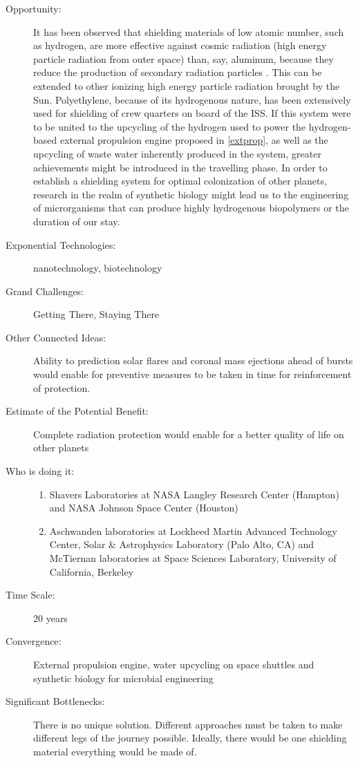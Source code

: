 \begin{description}
\item[Opportunity:] It has been  observed that shielding materials of low atomic number, such as  hydrogen, are more effective against cosmic radiation (high energy  particle radiation from outer space) than, say, aluminum, because they  reduce the production of secondary radiation particles \cite{Aschwanden2010}. This can be extended to other ionizing high energy  particle radiation brought by the Sun. Polyethylene, because of its  hydrogenous nature, has been extensively used for shielding of crew  quarters on board of the ISS. If this system were to be united to the  upcycling of the hydrogen used to power the hydrogen-based external  propulsion engine proposed in \autoref{extprop}, as well as the upcycling of waste water inherently  produced in the system, greater achievements might be introduced in the  travelling phase. In order to establish a shielding system for optimal  colonization of other planets, research in the realm of synthetic  biology might lead us to the engineering of microrganisms that can  produce highly hydrogenous biopolymers or the duration of our stay.  
 
\item[Exponential Technologies:]  nanotechnology, biotechnology
 
\item[Grand Challenges:] Getting  There, Staying There
 
\item[Other Connected Ideas:]  Ability to prediction solar flares and coronal mass ejections ahead of  bursts would enable for preventive measures to be taken in time for  reinforcement of protection. 
 
\item[Estimate of the Potential  Benefit:] Complete radiation protection would enable for a better  quality of life on other planets
 
\item[Who is doing it:] 
\hfill\begin{enumerate}
\item Shavers Laboratories at NASA  Langley Research Center (Hampton) and NASA Johnson Space Center  (Houston)
\item Aschwanden laboratories at  Lockheed Martin Advanced Technology Center, Solar \& Astrophysics  Laboratory (Palo Alto, CA) and McTiernan laboratories at Space Sciences  Laboratory, University of California, Berkeley
\end{enumerate}
 
\item[Time Scale:] 20 years
 
\item[Convergence:] External propulsion engine, water upcycling on space shuttles and synthetic  biology for microbial engineering 
 
\item[Significant Bottlenecks:]  There is no unique solution. Different approaches must be taken to make  different legs of the journey possible. Ideally, there would be one  shielding material everything would be made of.
   \end{description}
 
